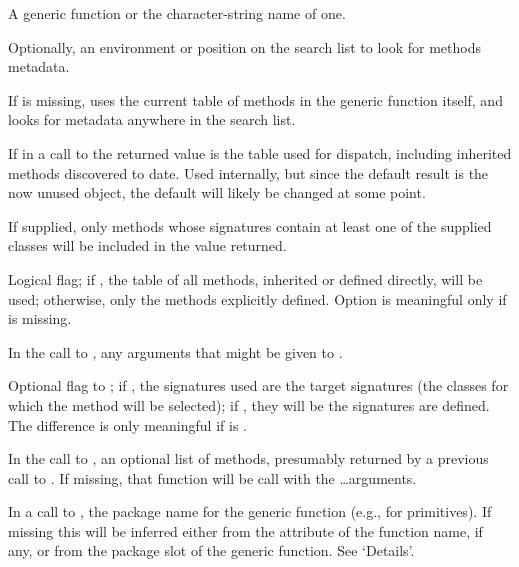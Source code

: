 \begin{Arguments}
\begin{ldescription}
\item[\code{f}] A generic function or the character-string name of one.
\item[\code{where}] Optionally, an environment or position on the search list
to look for methods metadata.

If  is missing,   uses the current
table of methods in the generic function itself, and
 looks for metadata anywhere in the search list.

\item[\code{table}]  If  in a call to  the
returned value is the table used for dispatch, including
inherited methods discovered to date.  Used internally, but
since the default result is the now unused  object,
the default will likely be changed at some point.

\item[\code{classes}] If supplied, only methods whose signatures contain at
least one of the supplied classes will be included in the value
returned.
\item[\code{inherited}] Logical flag; if , the table of all
methods, inherited or defined directly, will be used; otherwise,
only the methods explicitly defined.  Option  is
meaningful only if  is missing.

\item[\code{...}] In the call to , any arguments
that might be given to .
\item[\code{target}] Optional flag to ; if
, the signatures used are the target signatures (the
classes for which the method will be selected); if ,
they will be the signatures are defined.  The difference is only
meaningful if  is .
\item[\code{methods}] In the call to , an optional
list of methods, presumably returned by a previous call to
.  If missing, that function will be call with the
\dots arguments.

\item[\code{package}] In a call to , the package name for
the generic function (e.g.,  for primitives).  If
missing this will be inferred either from the 
attribute of the function name, if any, or from the package slot of
the generic function.  See `Details'.
\end{ldescription}
\end{Arguments}
